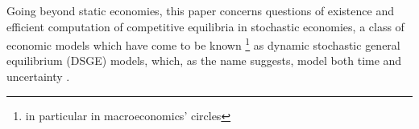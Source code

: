 


Going beyond static economies, this paper concerns questions of existence and efficient computation of competitive equilibria in stochastic economies, a class of economic models which have come to be known%
\footnote{in particular in macroeconomics' circles}
as dynamic stochastic general equilibrium (DSGE) models, which, as the name suggests, model both time and uncertainty .
\fi



